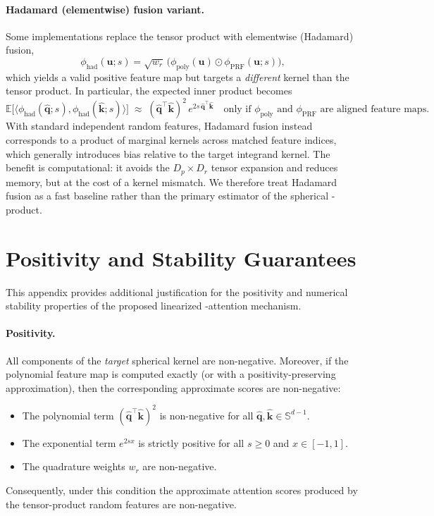 \documentclass{article}
\DeclareRobustCommand{\E}{\text{\normalfont\tifinaghfont ⵟ}}
\newcommand{\Sph}{\mathbb{S}}
\begin{document}
\paragraph{Hadamard (elementwise) fusion variant.}
Some implementations replace the tensor product with elementwise
(Hadamard) fusion,
\[
\phi_{\mathrm{had}}(\mathbf{u}; s)
=
\sqrt{w_r}\,
\bigl(
\phi_{\mathrm{poly}}(\mathbf{u})
\odot
\phi_{\mathrm{PRF}}(\mathbf{u}; s)
\bigr),
\]
which yields a valid positive feature map but targets a \emph{different}
kernel than the tensor product.
In particular, the expected inner product becomes
\[
\mathbb{E}\big[
\langle
\phi_{\mathrm{had}}(\widehat{\mathbf{q}}; s),
\phi_{\mathrm{had}}(\widehat{\mathbf{k}}; s)
\rangle
\big]
\;\approx\;
(\widehat{\mathbf{q}}^\top \widehat{\mathbf{k}})^2
\,e^{2s\,\widehat{\mathbf{q}}^\top \widehat{\mathbf{k}}}
\quad
\text{only if }
\phi_{\mathrm{poly}}
\text{ and }
\phi_{\mathrm{PRF}}
\text{ are aligned feature maps.}
\]
With standard independent random features, Hadamard fusion instead
corresponds to a product of marginal kernels across matched feature
indices, which generally introduces bias relative to the target
integrand kernel.
The benefit is computational: it avoids the $D_p\times D_r$ tensor
expansion and reduces memory, but at the cost of a kernel mismatch.
We therefore treat Hadamard fusion as a fast baseline rather than the
primary estimator of the spherical \E-product.

\section{Positivity and Stability Guarantees}
\label{app:stability}

This appendix provides additional justification for the positivity and numerical stability properties of the proposed linearized \E-attention mechanism.

\paragraph{Positivity.}
All components of the \emph{target} spherical kernel are non-negative. Moreover, if the polynomial feature map is computed exactly (or with a positivity-preserving approximation), then the corresponding approximate scores are non-negative:
\begin{itemize}[leftmargin=1.4em]
    \item The polynomial term
    $(\widehat{\mathbf{q}}^\top \widehat{\mathbf{k}})^2$
    is non-negative for all
    $\widehat{\mathbf{q}}, \widehat{\mathbf{k}} \in \Sph^{d-1}$.
    \item The exponential term $e^{2s x}$ is strictly positive for all
    $s \ge 0$ and $x \in [-1,1]$.
    \item The quadrature weights $w_r$ are non-negative.
\end{itemize}
Consequently, under this condition the approximate attention scores produced by the tensor-product random features are non-negative.
\end{document}
